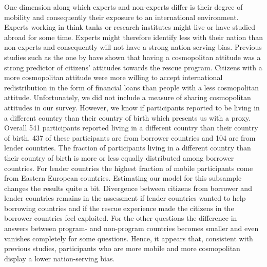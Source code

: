 One dimension along which experts and non-experts differ is their degree of mobility and consequently their exposure to an international environment. Experts working in think tanks or research institutes might live or have studied abroad for some time. Experts might therefore identify less with their nation than non-experts and consequently will not have a strong nation-serving bias. Previous studies such as the one by \cite{bechtel} have shown that having a cosmopolitan attitude was a strong predictor of citizens' attitudes towards the rescue program. Citizens with a more cosmopolitan attitude were more willing to accept international redistribution in the form of financial loans than people with a less cosmopolitan attitude. Unfortunately, we did not include a measure of sharing cosmopolitan attitudes in our survey. However, we know if participants reported to be living in a different country than their country of birth which presents us with a proxy. Overall 541 participants reported living in a different country than their country of birth. 437 of these participants are from borrower countries and 104 are from lender countries. The fraction of participants living in a different country than their country of birth is more or less equally distributed among borrower countries. For lender countries the highest fraction of mobile participants come from Eastern European countries. Estimating our model for this subsample changes the results quite a bit. Divergence between citizens from borrower and lender countries remains in the assessment if lender countries wanted to help borrowing countries and if the rescue experience made the citizens in the borrower countries feel exploited. For the other questions the difference in answers between program- and non-program countries becomes smaller and even vanishes completely for some questions. Hence, it appears that, consistent with previous studies, participants who are more mobile and more cosmopolitan display a lower nation-serving bias.  \\

